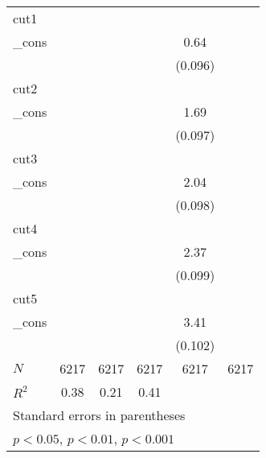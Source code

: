 {\begin{tabular}{l*{5}{c}}
\hline
cut1        &                     &                     &                     &                     &                     \\
\_cons      &                     &                     &                     &        0.64\sym{***}&                     \\
            &                     &                     &                     &     (0.096)         &                     \\
\hline
cut2        &                     &                     &                     &                     &                     \\
\_cons      &                     &                     &                     &        1.69\sym{***}&                     \\
            &                     &                     &                     &     (0.097)         &                     \\
\hline
cut3        &                     &                     &                     &                     &                     \\
\_cons      &                     &                     &                     &        2.04\sym{***}&                     \\
            &                     &                     &                     &     (0.098)         &                     \\
\hline
cut4        &                     &                     &                     &                     &                     \\
\_cons      &                     &                     &                     &        2.37\sym{***}&                     \\
            &                     &                     &                     &     (0.099)         &                     \\
\hline
cut5        &                     &                     &                     &                     &                     \\
\_cons      &                     &                     &                     &        3.41\sym{***}&                     \\
            &                     &                     &                     &     (0.102)         &                     \\
\hline
\(N\)       &        6217         &        6217         &        6217         &        6217         &        6217         \\
\(R^{2}\)   &        0.38         &        0.21         &        0.41         &                     &                     \\
\hline\hline
\multicolumn{6}{l}{\footnotesize Standard errors in parentheses}\\
\multicolumn{6}{l}{\footnotesize \sym{*} \(p<0.05\), \sym{**} \(p<0.01\), \sym{***} \(p<0.001\)}\\
\end{tabular}
}
